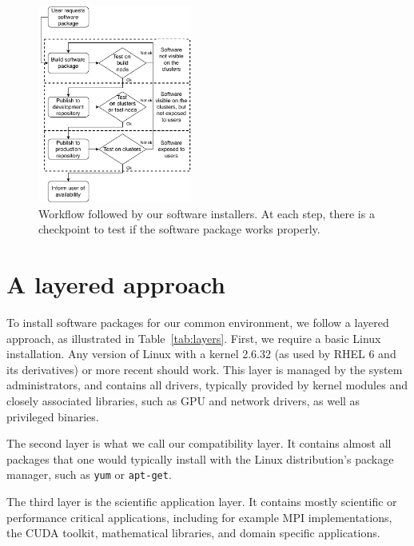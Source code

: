 \documentclass[sigconf]{acmart}
\begin{document}
\begin{figure}
  \includegraphics[width=0.45\textwidth]{Software-installation-workflow.pdf}
  \caption{Workflow followed by our software installers. At each step, there is a checkpoint to test if the software package works properly.}
  \label{fig:Workflow}
\end{figure}

\section{A layered approach}
\label{sec:Layered_environment}
To install software packages for our common environment, we follow a layered approach, as illustrated in Table~\ref{tab:layers}. First, we require a basic Linux installation. Any version of Linux with a kernel 2.6.32 (as used by RHEL 6 and its derivatives) or more recent should work. This layer is managed by the system administrators, and contains all drivers, typically provided by kernel modules and closely associated libraries, such as GPU and network drivers, as well as privileged binaries. 

The second layer is what we call our compatibility layer. It contains almost all packages that one would typically install with the Linux distribution's package manager, such as \texttt{yum} or \texttt{apt-get}. 

The third layer is the scientific application layer. It contains mostly scientific or performance critical applications, including for example MPI implementations, the CUDA toolkit, mathematical libraries, and domain specific applications. 
\end{document}
